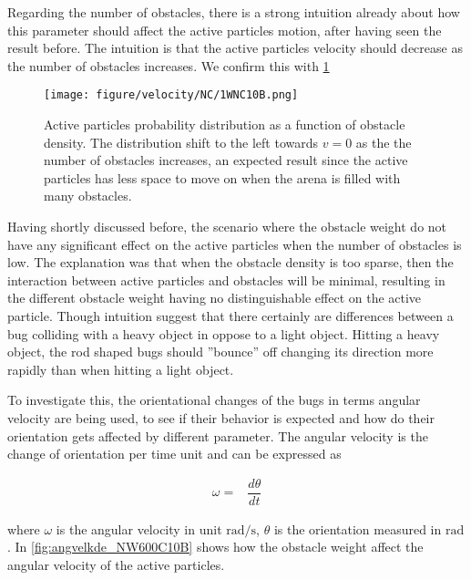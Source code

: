 Regarding the number of obstacles, there is a strong intuition already about how this parameter 
should affect the active particles motion, after having seen the result before. 
The intuition is that the active particles velocity should decrease as the number of obstacles increases. 
We confirm this with \cref{fig:velkde_1WNC10B}


\begin{figure}[htpb]
    \centering
    \texttt{[image: figure/velocity/NC/1WNC10B.png]}
    \caption{Active particles probability distribution as a function of obstacle density. 
	    The distribution shift to the left towards $v=0$ as the the number of obstacles increases, 
	    an expected result since the active particles has less space to move on when the arena 
	    is filled with many obstacles.
    }
    \label{fig:velkde_1WNC10B}
\end{figure}

Having shortly discussed before, the scenario where the obstacle weight do not have any significant 
effect on the active particles when the number of obstacles is low. The explanation was that when the 
obstacle density is too sparse, then the interaction between active particles and obstacles will be minimal, 
resulting in the different obstacle weight having no distinguishable effect on the active particle. 
Though intuition suggest that there certainly are differences between a bug colliding with a heavy object
in oppose to a light object. Hitting a heavy object, the rod shaped bugs should ''bounce'' off changing 
its direction more rapidly than when hitting a light object. 

To investigate this, the orientational changes of the bugs in terms angular velocity are being used, 
to see if their behavior is expected and how do their orientation gets affected by different parameter. 
The angular velocity is the change of orientation per time unit and can be expressed as

\begin{align}
    \omega =& \dfrac{d\theta}{dt}
\end{align}

where $\omega$ is the angular velocity in unit $\si{\radian\per\second}$, $\theta$ is the orientation 
measured in $\si{\radian}$. In \cref{fig:angvelkde_NW600C10B} shows how the obstacle weight affect 
the angular velocity of the active particles.  





